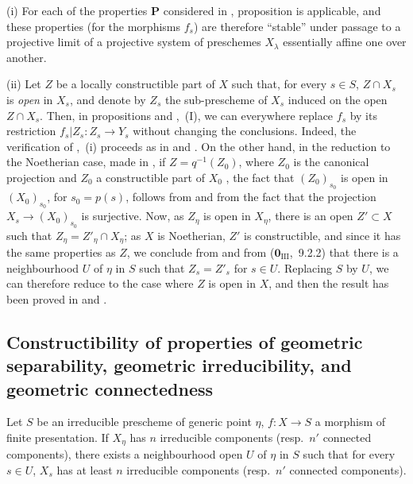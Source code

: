 \begin{remarks}[9.6.7]
\label{IV.9.6.7}
(i) For each of the properties $\mathbf{P}$ considered in , proposition  is applicable, and these properties (for the morphisms $f_s$) are therefore ``stable'' under passage to a projective limit of a projective system of preschemes $X_\lambda$ essentially affine  one over another.

(ii) Let $Z$ be a locally constructible part of $X$ such that, for every $s\in S$, $Z\cap X_s$ is \emph{open} in $X_s$, and denote by $Z_s$ the sub-prescheme of $X_s$ induced on the open $Z\cap X_s$.
Then, in propositions  and ,~(I), we can everywhere replace $f_s$ by its restriction $f_s|Z_s:Z_s\to Y_s$ without changing the conclusions.
Indeed, the verification of ,~(i) proceeds as in  and .
On the other hand, in the reduction to the Noetherian case, made in , if $Z=q^{-1}(Z_0)$, where $Z_0$ is the canonical projection and $Z_0$ a constructible part of $X_0$ , the fact that $(Z_0)_{s_0}$ is open in $(X_0)_{s_0}$, for $s_0=p(s)$, follows from  and from the fact that the projection $X_s\to(X_0)_{s_0}$ is surjective.
Now, as $Z_\eta$ is open in $X_\eta$, there is an open $Z'\subset X$ such that $Z_\eta=Z'_\eta\cap X_\eta$; as $X$ is Noetherian, $Z'$ is constructible, and since it has the same properties as $Z$, we conclude from  and from ($\mathbf{0}_{\mathrm{III}}$,~9.2.2) that there is a neighbourhood $U$ of $\eta$ in $S$ such that $Z_s=Z'_s$ for $s\in U$.
Replacing $S$ by $U$, we can therefore reduce to the case where $Z$ is open in $X$, and then the result has been proved in  and .
\end{remarks}

\subsection{Constructibility of properties of geometric separability, geometric irreducibility, and geometric connectedness}
\label{subsection:IV.9.7}

\begin{lemma}[9.7.1]
\label{IV.9.7.1}
Let $S$ be an irreducible prescheme of generic point $\eta$, $f:X\to S$ a morphism of finite presentation.
If $X_\eta$ has $n$ irreducible components (resp.\ $n'$ connected components), there exists a neighbourhood open $U$ of $\eta$ in $S$ such that for every $s\in U$, $X_s$ has at least $n$ irreducible components (resp.\ $n'$ connected components).
\end{lemma}

